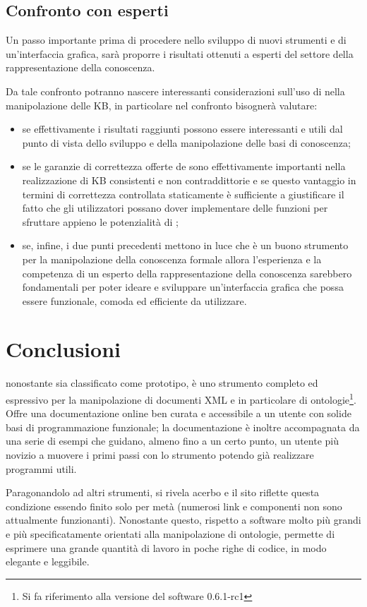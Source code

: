 \subsection{Confronto con esperti}
Un passo importante prima di procedere nello sviluppo di nuovi strumenti e di un'interfaccia grafica, sarà proporre i risultati ottenuti a esperti del settore della rappresentazione della conoscenza.

Da tale confronto potranno nascere interessanti considerazioni sull'uso di \cduce nella manipolazione delle KB, in particolare nel confronto bisognerà valutare:
\begin{itemize}
	\item se effettivamente i risultati raggiunti possono essere interessanti e utili dal punto di vista dello sviluppo e della manipolazione delle basi di conoscenza;
	\item se le garanzie di correttezza offerte de \cduce sono effettivamente importanti nella realizzazione di KB consistenti e non contraddittorie e se questo vantaggio in termini di correttezza controllata staticamente è sufficiente a giustificare il fatto che gli utilizzatori possano dover implementare delle funzioni per sfruttare appieno le potenzialità di \cduce;
	\item se, infine, i due punti precedenti mettono in luce che \cduce è un buono strumento per la manipolazione della conoscenza formale allora l'esperienza e la competenza di un esperto della rappresentazione della conoscenza sarebbero fondamentali per poter ideare e sviluppare un'interfaccia grafica che possa essere funzionale, comoda ed efficiente da utilizzare.
\end{itemize}
\section{Conclusioni}
\cduce nonostante sia classificato come prototipo, è uno strumento completo ed espressivo per la manipolazione di documenti XML e in particolare di ontologie\footnote{Si fa riferimento alla versione del software 0.6.1-rc1}. Offre una documentazione online ben curata e accessibile a un utente con solide basi di programmazione funzionale; la documentazione è inoltre accompagnata da una serie di esempi che guidano, almeno fino a un certo punto, un utente più novizio a muovere i primi passi con lo strumento potendo già realizzare programmi utili.

Paragonandolo ad altri strumenti, si rivela acerbo e il sito riflette questa condizione essendo finito solo per metà (numerosi link e componenti non sono attualmente funzionanti). Nonostante questo, rispetto a software molto più grandi e più specificatamente orientati alla manipolazione di ontologie, \cduce permette di esprimere una grande quantità di lavoro in poche righe di codice, in modo elegante e leggibile. 

